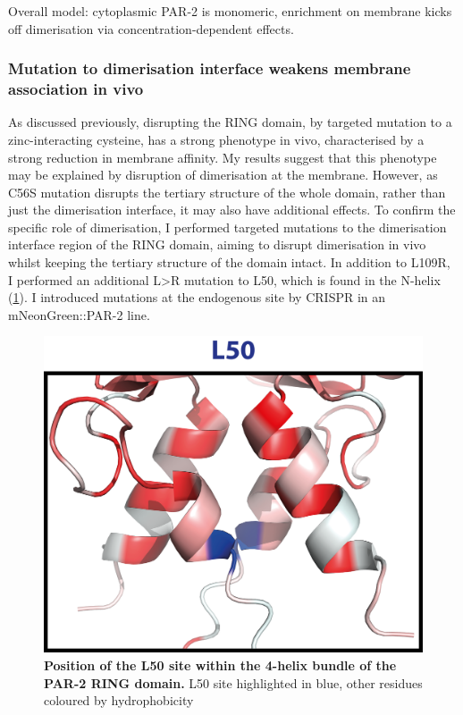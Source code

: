 \documentclass[12pt]{"article"}
\newcommand{\mycaption}[2]{\caption[#1]{\textbf{#1.} #2}}
\begin{document}
Overall model: cytoplasmic PAR-2 is monomeric, enrichment on membrane kicks off dimerisation via concentration-dependent effects.


\subsubsection{Mutation to dimerisation interface weakens membrane association in vivo}

As discussed previously, disrupting the RING domain, by targeted mutation to a zinc-interacting cysteine, has a strong phenotype in vivo, characterised by a strong reduction in membrane affinity. My results suggest that this phenotype may be explained by disruption of dimerisation at the membrane. However, as C56S mutation disrupts the tertiary structure of the whole domain, rather than just the dimerisation interface, it may also have additional effects. To confirm the specific role of dimerisation, I performed targeted mutations to the dimerisation interface region of the RING domain, aiming to disrupt dimerisation in vivo whilst keeping the tertiary structure of the domain intact. In addition to L109R, I performed an additional L>R mutation to L50, which is found in the N-helix (\cref{fig:l50_structure}). I introduced mutations at the endogenous site by CRISPR in an mNeonGreen::PAR-2 line. \\

\begin{figure}
\includegraphics[scale=0.8]{l50_structure}
\mycaption{Position of the L50 site within the 4-helix bundle of the PAR-2 RING domain}{L50 site highlighted in blue, other residues coloured by hydrophobicity}
\label{fig:l50_structure}
\end{figure}
\end{document}
